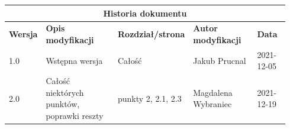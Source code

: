 \documentclass{sprz}
\begin{document}
\begin{documenttable}[]
\end{documenttable}
\begin{center}
  \begin{tabular}{ |p{0.1\linewidth}|p{0.28\linewidth}|p{0.2\linewidth}|p{0.24\linewidth}|p{0.12\linewidth}| }
    \hline
    \multicolumn{5}{|c|}{\textbf{Historia dokumentu}} \\
    \hline
    \textbf{Wersja} & \textbf{Opis modyfikacji} & \textbf{Rozdział/strona} & \textbf{Autor modyfikacji} & \textbf{Data}\\
    \hline
    {1.0} & {Wstępna wersja} & {Całość} & {Jakub Prucnal} & {2021-12-05}\\
    \hline
    {2.0} & {Całość niektórych punktów, poprawki reszty} & {punkty 2, 2.1, 2.3} & {Magdalena Wybraniec} & {2021-12-19}\\
    \hline
  \end{tabular}
\end{center}
\end{document}
